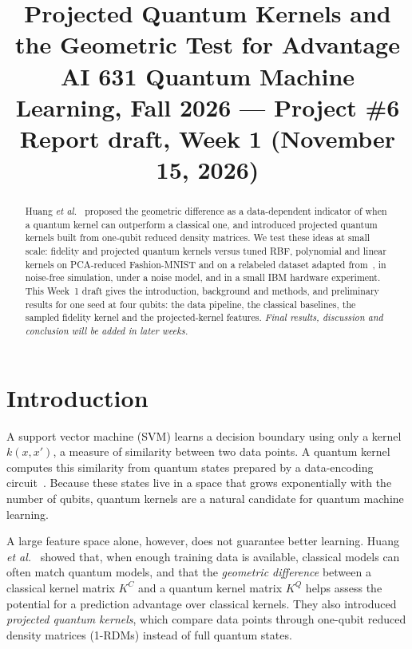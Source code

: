 \documentclass[conference]{IEEEtran}
\begin{document}
\title{Projected Quantum Kernels and the Geometric Test for Advantage\\
\large AI 631 Quantum Machine Learning, Fall 2026 --- Project \#6\\
Report draft, Week 1 (November 15, 2026)}

\author{
}

\maketitle

\begin{abstract}
Huang \textit{et al.}~\cite{huang2021} proposed the geometric difference as a data-dependent indicator of when a quantum kernel can outperform a classical one, and introduced projected quantum kernels built from one-qubit reduced density matrices. We test these ideas at small scale: fidelity and projected quantum kernels versus tuned RBF, polynomial and linear kernels on PCA-reduced Fashion-MNIST and on a relabeled dataset adapted from~\cite{huang2021}, in noise-free simulation, under a noise model, and in a small IBM hardware experiment. This Week~1 draft gives the introduction, background and methods, and preliminary results for one seed at four qubits: the data pipeline, the classical baselines, the sampled fidelity kernel and the projected-kernel features. \textit{Final results, discussion and conclusion will be added in later weeks.}
\end{abstract}

\section{Introduction}
A support vector machine (SVM) learns a decision boundary using only a kernel $k(x,x')$, a measure of similarity between two data points. A quantum kernel computes this similarity from quantum states prepared by a data-encoding circuit~\cite{schuld2019,havlicek2019}. Because these states live in a space that grows exponentially with the number of qubits, quantum kernels are a natural candidate for quantum machine learning.

A large feature space alone, however, does not guarantee better learning. Huang \textit{et al.}~\cite{huang2021} showed that, when enough training data is available, classical models can often match quantum models, and that the \emph{geometric difference} between a classical kernel matrix $K^{C}$ and a quantum kernel matrix $K^{Q}$ helps assess the potential for a prediction advantage over classical kernels. They also introduced \emph{projected quantum kernels}, which compare data points through one-qubit reduced density matrices (1-RDMs) instead of full quantum states.
\end{document}
